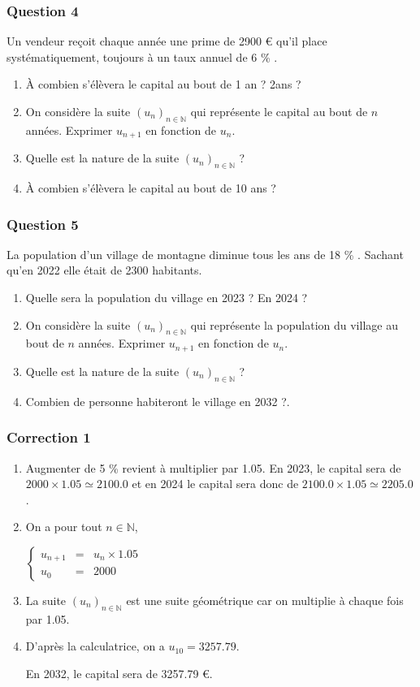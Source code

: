 \documentclass[15pt, mathserif]{beamer}
\newcommand{\N}{\mathbb{N}}			%
\newcommand{\st}[1]{$(#1_n)_{n \in \N}$}
\begin{document}
\begin{frame} 
	\frametitle{Question 4}
 Un vendeur reçoit chaque année une prime de  2900 \euro{} qu'il place systématiquement, toujours à un taux annuel de 6 \% . 
 \begin{enumerate} 
 	 \item À combien s'élèvera le capital au bout de 1 an ? 2ans ?  
 	 \item On considère la suite \st{u} qui représente le capital au bout de $n$ années. Exprimer $u_{n+1}$ en fonction de $u_n$. 
 	 \item Quelle est la nature de la suite \st{u} ? 
 	 \item  À combien s'élèvera le capital au bout de 10 ans ? 
 \end{enumerate} \end{frame}


\begin{frame} 
	\frametitle{Question 5}
 La population d'un village de montagne diminue tous les ans de 18 \% . Sachant qu'en 2022 elle était de 2300 habitants. 
 \begin{enumerate} 
 	 \item Quelle sera la population du village en 2023 ? En 2024 ? 
 	 \item On considère la suite \st{u} qui représente la population du village au bout de $n$ années. Exprimer $u_{n+1}$ en fonction de $u_n$. 
 	 \item Quelle est la nature de la suite \st{u} ? 
 	 \item Combien de personne habiteront le village en 2032 ?. 
 \end{enumerate} \end{frame}


\begin{frame}
\vspace{-10mm}
	\frametitle{Correction 1}
\begin{enumerate} 
 	 \item Augmenter de 5 \% revient à multiplier par  1.05. En 2023, le capital sera de $2000 \times  1.05\simeq 2100.0$ et en 2024 le capital sera donc de  $2100.0 \times  1.05\simeq 2205.0$.  
 	 \item On a pour tout $n \in \N$, 
 
 \hfil$\left\{\begin{array}{rcl} 
 u_{n+1} & = & u_n \times  1.05\\ u_0 & = &  2000\end{array} \right.$ 
 	 \item La suite \st{u} est une suite géométrique car on multiplie à chaque fois par  1.05. 
 	 \item D'après la calculatrice, on a $u_{10}=3257.79$. 
 
 En 2032, le capital sera de 3257.79 \euro. 
 \end{enumerate} 
 
 \end{frame}
\end{document}
